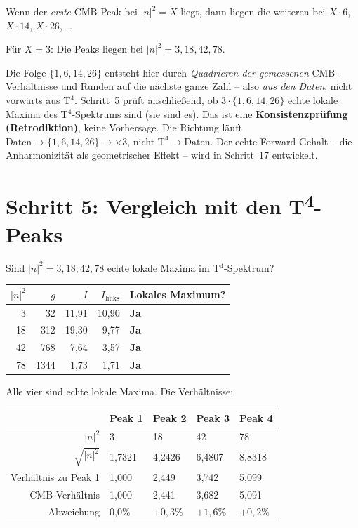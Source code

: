 Wenn der \emph{erste} CMB-Peak bei $|n|^2 = X$ liegt, dann
liegen die weiteren bei $X \cdot 6$, $X \cdot 14$, $X \cdot 26$, \ldots

Für $X = 3$: Die Peaks liegen bei $|n|^2 = 3, 18, 42, 78$.

\begin{tcolorbox}[colback=red!4!white, colframe=red!55!black,
  title={Ehrliche Einordnung von Schritt~4 (Richtung der Schlussfolgerung)}]
Die Folge $\{1,6,14,26\}$ entsteht hier durch \emph{Quadrieren der
gemessenen} CMB-Verhältnisse und Runden auf die nächste ganze Zahl --
also \emph{aus den Daten}, nicht vorwärts aus T$^4$. Schritt~5 prüft
anschließend, ob $3\cdot\{1,6,14,26\}$ echte lokale Maxima des
T$^4$-Spektrums sind (sie sind es). Das ist eine \textbf{Konsistenzprüfung
(Retrodiktion)}, keine Vorhersage. Die Richtung läuft
$\text{Daten}\to\{1,6,14,26\}\to{\times3}$, nicht $\text{T}^4\to\text{Daten}$.
Der echte Forward-Gehalt -- die Anharmonizität als geometrischer Effekt --
wird in Schritt~17 entwickelt.
\end{tcolorbox}

\section{Schritt 5: Vergleich mit den T\textsuperscript{4}-Peaks}

Sind $|n|^2 = 3, 18, 42, 78$ echte lokale Maxima im T$^4$-Spektrum?

\begin{center}
\begin{tabular}{rrrrl}
\toprule
$|n|^2$ & $g$ & $I$ & $I_\mathrm{links}$ & Lokales Maximum? \\
\midrule
3  & 32   & 11{,}91 & 10{,}90 & \textbf{Ja} \\
18 & 312  & 19{,}30 & 9{,}77  & \textbf{Ja} \\
42 & 768  & 7{,}64  & 3{,}57  & \textbf{Ja} \\
78 & 1344 & 1{,}73  & 1{,}71  & \textbf{Ja} \\
\bottomrule
\end{tabular}
\end{center}

Alle vier sind echte lokale Maxima. Die Verhältnisse:

\begin{center}
\begin{tabular}{rllll}
\toprule
 & Peak 1 & Peak 2 & Peak 3 & Peak 4 \\
\midrule
$|n|^2$ & 3 & 18 & 42 & 78 \\
$\sqrt{|n|^2}$ & 1{,}7321 & 4{,}2426 & 6{,}4807 & 8{,}8318 \\
Verhältnis zu Peak 1 & 1{,}000 & 2{,}449 & 3{,}742 & 5{,}099 \\
CMB-Verhältnis & 1{,}000 & 2{,}441 & 3{,}682 & 5{,}091 \\
Abweichung & 0{,}0\% & $+0{,}3\%$ & $+1{,}6\%$ & $+0{,}2\%$ \\
\bottomrule
\end{tabular}
\end{center}

